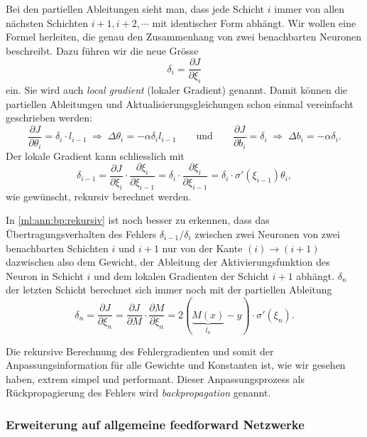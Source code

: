 Bei den partiellen Ableitungen sieht man, dass jede Schicht $i$ immer von allen
nächsten Schichten $i+1, i+2, \cdots$ mit identischer Form abhängt.
Wir wollen eine Formel herleiten, die genau den Zusammenhang von zwei
benachbarten Neuronen beschreibt. Dazu führen wir die neue Grösse 
\begin{equation}
    \delta_i = \frac{\partial J}{\partial \xi_i}
\end{equation}
ein. Sie wird auch \emph{local gradient} (lokaler Gradient) genannt. Damit können
die partiellen Ableitungen und Aktualisierungsgleichungen schon einmal vereinfacht geschrieben werden:
\begin{equation}
    \frac{\partial J}{\partial \theta_i} = \delta_i \cdot l_{i-1}
    \;\Rightarrow\; \Delta \theta_i = - \alpha \delta_i l_{i-1}
    \qquad\text{und}\qquad
    \frac{\partial J}{\partial b_i} = \delta_i
    \; \Rightarrow\; \Delta b_i = - \alpha \delta_i.
\end{equation}
Der lokale Gradient kann schliesslich mit
\begin{equation}
    \delta_{i-1} = \frac{\partial J}{\partial \xi_i} \cdot \frac{\partial \xi_i}{\partial \xi_{i-1}}
    = \delta_i \cdot \frac{\partial \xi_i}{\partial \xi_{i-1}}
    = \delta_i \cdot \sigma'(\xi_{i-1}) \theta_i
    \label{ml:ann:bp:rekursiv},
\end{equation}
wie gewünscht, rekursiv berechnet werden.

In \eqref{ml:ann:bp:rekursiv} ist noch besser zu erkennen, dass das Übertragungsverhalten
des Fehlers $\delta_{i-1}/\delta_i$
zwischen zwei Neuronen von zwei benachbarten Schichten $i$ und $i+1$ nur von der Kante
$(i)\rightarrow(i+1)$ dazwischen also dem
Gewicht, der Ableitung der Aktivierungsfunktion des Neuron in Schicht $i$ und dem lokalen
Gradienten der Schicht $i+1$ abhängt.
$\delta_n$ der letzten Schicht berechnet sich immer noch mit der partiellen Ableitung
\begin{equation}
    \delta_n = \frac{\partial J}{\partial \xi_n}
    = \frac{\partial J}{\partial M} \cdot \frac{\partial M}{\partial \xi_n}
    = 2(\underbrace{M(x)}_{l_n} - y) \cdot \sigma'(\xi_n).
\end{equation}

Die rekursive Berechnung des Fehlergradienten und somit der Anpassungsinformation für alle
Gewichte und Konstanten ist, wie wir gesehen haben, extrem simpel und performant.
Dieser Anpassungsprozess als Rückpropagierung des Fehlers wird \emph{backpropagation} genannt.

\subsubsection{Erweiterung auf allgemeine feedforward Netzwerke}

